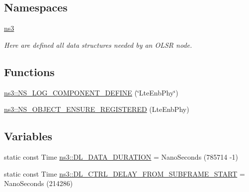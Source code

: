 \subsection*{Namespaces}
\begin{DoxyCompactItemize}
\item 
 \hyperlink{namespacens3}{ns3}
\begin{DoxyCompactList}\small\item\em Here are defined all data structures needed by an O\+L\+SR node. \end{DoxyCompactList}\end{DoxyCompactItemize}
\subsection*{Functions}
\begin{DoxyCompactItemize}
\item 
\hyperlink{namespacens3_a8cab5865175e62026e34b06616ad8a67}{ns3\+::\+N\+S\+\_\+\+L\+O\+G\+\_\+\+C\+O\+M\+P\+O\+N\+E\+N\+T\+\_\+\+D\+E\+F\+I\+NE} (\char`\"{}Lte\+Enb\+Phy\char`\"{})
\item 
\hyperlink{namespacens3_abb563de0f9db35929b4beb708de12657}{ns3\+::\+N\+S\+\_\+\+O\+B\+J\+E\+C\+T\+\_\+\+E\+N\+S\+U\+R\+E\+\_\+\+R\+E\+G\+I\+S\+T\+E\+R\+ED} (Lte\+Enb\+Phy)
\end{DoxyCompactItemize}
\subsection*{Variables}
\begin{DoxyCompactItemize}
\item 
static const Time \hyperlink{namespacens3_a20b78f62487551be8f013d33160d45bb}{ns3\+::\+D\+L\+\_\+\+D\+A\+T\+A\+\_\+\+D\+U\+R\+A\+T\+I\+ON} = Nano\+Seconds (785714 -\/1)
\item 
static const Time \hyperlink{namespacens3_a1c291c1be200321560d497ca4ca37247}{ns3\+::\+D\+L\+\_\+\+C\+T\+R\+L\+\_\+\+D\+E\+L\+A\+Y\+\_\+\+F\+R\+O\+M\+\_\+\+S\+U\+B\+F\+R\+A\+M\+E\+\_\+\+S\+T\+A\+RT} = Nano\+Seconds (214286)
\end{DoxyCompactItemize}
